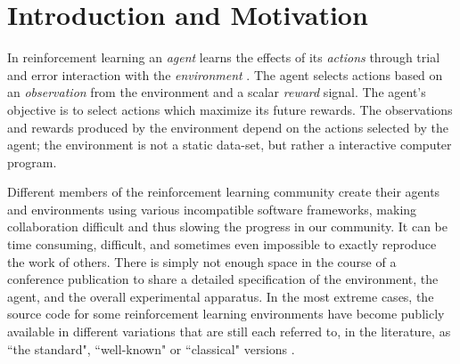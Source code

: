 \documentclass[twoside,11pt]{article}
\begin{document}
\section{Introduction and Motivation}
In reinforcement learning an {\it agent} learns the effects of its {\it actions} through trial and error interaction with the {\it environment} \citep{rlbook, rlsurvey,ndp}. The agent selects actions based on an {\it observation} from the environment and a scalar {\it reward} signal. The agent's objective is to select actions which maximize its future rewards. The observations and rewards produced by the environment depend on the actions selected by the agent; the environment is not a static data-set, but rather a interactive computer program.
 


Different members of the reinforcement learning community create their agents and environments using various incompatible software frameworks, making collaboration difficult and thus slowing the progress in our community. It  can be time consuming, difficult, and sometimes even impossible to exactly reproduce the work of others.  There is simply not enough space in the course of a conference publication to share a detailed specification of the environment, the agent, and the overall experimental apparatus.
In the most extreme cases, the source code for some reinforcement learning environments have become publicly available in different variations that are still each referred to, in the literature, as ``the standard", ``well-known" or ``classical"  versions \citep{whiteThesis}. %



\end{document}
